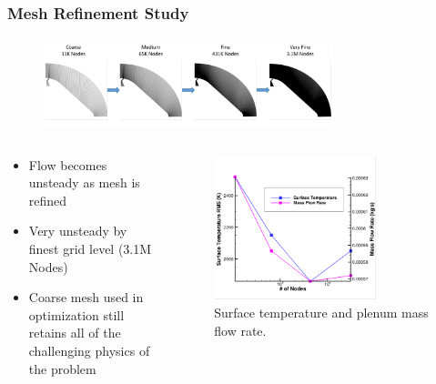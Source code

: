 \documentclass{beamer}
\begin{document}
\begin{frame}
  \frametitle{Mesh Refinement Study}
\begin{figure}[h]
  \centering
  \includegraphics[width=0.75\textwidth]{figures/mesh-progression.png}
\end{figure}
\vspace{-1cm}
  \begin{columns}
    \begin{column}{0.5\textwidth}
      \begin{itemize}
        \item Flow becomes unsteady as mesh is refined
        \item Very unsteady by finest grid level (3.1M Nodes)
        \item Coarse mesh used in optimization still retains all of the
          challenging physics of the problem
      \end{itemize}
    \end{column}
    \begin{column}{0.5\textwidth}
\begin{figure}[!h]
  \centering
  \includegraphics[width=0.75\textwidth]{figures/t-m-conv.png}
  \caption{Surface temperature and plenum mass flow rate.}
\end{figure}
    \end{column}
  \end{columns}
\end{frame}
\end{document}
